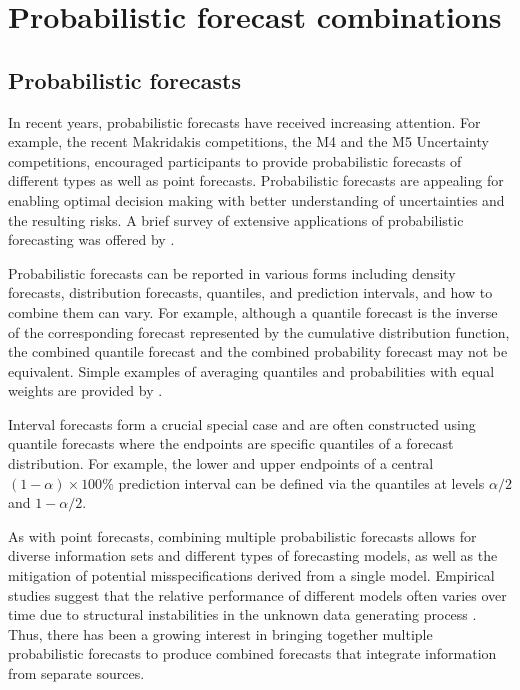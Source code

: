 \documentclass[a4paper,11pt]{article}
\begin{document}
\section{Probabilistic forecast combinations}
\label{sec:probabilistic}

\subsection{Probabilistic forecasts}

In recent years, probabilistic forecasts have received increasing attention. For example, the recent Makridakis competitions, the M4 and the M5 Uncertainty \citep{Makridakis2020-lz} competitions, encouraged participants to provide probabilistic forecasts of different types as well as point forecasts. Probabilistic forecasts are appealing for enabling optimal decision making with better understanding of uncertainties and the resulting risks. A brief survey of extensive applications of probabilistic forecasting was offered by \citet{Gneiting2014-tz}.

Probabilistic forecasts can be reported in various forms including density forecasts, distribution forecasts, quantiles, and prediction intervals, and how to combine them can vary. For example, although a quantile forecast is the inverse of the corresponding forecast represented by the cumulative distribution function, the combined quantile forecast and the combined probability forecast may not be equivalent. Simple examples of averaging quantiles and probabilities with equal weights are provided by \citet{Lichtendahl2013-rt}.

Interval forecasts form a crucial special case and are often constructed using quantile forecasts where the endpoints are specific quantiles of a forecast distribution. For example, the lower and upper endpoints of a central $(1-\alpha)\times 100\%$ prediction interval can be defined via the quantiles at levels $\alpha/2$ and $1-\alpha/2$.

As with point forecasts, combining multiple probabilistic forecasts allows for diverse information sets and different types of forecasting models, as well as the mitigation of potential misspecifications derived from a single model. Empirical studies suggest that the relative performance of different models often varies over time due to structural instabilities in the unknown data generating process \citep[e.g.,][]{Billio2013-sg}. Thus, there has been a growing interest in bringing together multiple probabilistic forecasts to produce combined forecasts that integrate information from separate sources.
\end{document}
